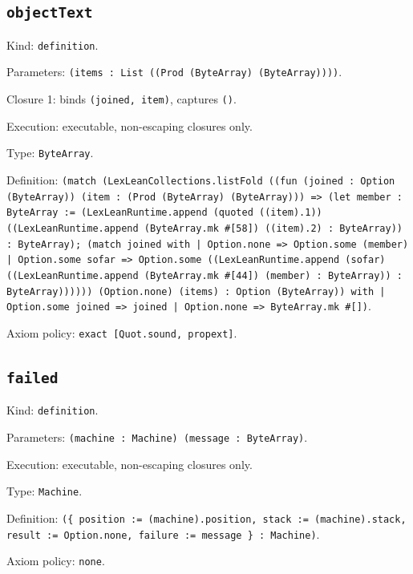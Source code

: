 \documentclass[11pt]{article}
\begin{document}
\subsection*{\texttt{objectText}}
\noindent Kind: \texttt{definition}.\par
\noindent Parameters: \texttt{(items : List ((Prod (ByteArray) (ByteArray))))}.\par
\noindent Closure 1: binds \texttt{(joined, item)}, captures \texttt{()}.\par
\noindent Execution: executable, non-escaping closures only.\par
\noindent Type: \texttt{ByteArray}.\par
\noindent Definition: \texttt{(match (LexLeanCollections.listFold ((fun (joined : Option (ByteArray)) (item : (Prod (ByteArray) (ByteArray))) => (let member : ByteArray := (LexLeanRuntime.append (quoted ((item).1)) ((LexLeanRuntime.append (ByteArray.mk \#[58]) ((item).2) : ByteArray)) : ByteArray); (match joined with | Option.none => Option.some (member) | Option.some sofar => Option.some ((LexLeanRuntime.append (sofar) ((LexLeanRuntime.append (ByteArray.mk \#[44]) (member) : ByteArray)) : ByteArray)))))) (Option.none) (items) : Option (ByteArray)) with | Option.some joined => joined | Option.none => ByteArray.mk \#[])}.\par
\noindent Axiom policy: \texttt{exact [Quot.sound, propext]}.\par
\subsection*{\texttt{failed}}
\noindent Kind: \texttt{definition}.\par
\noindent Parameters: \texttt{(machine : Machine) (message : ByteArray)}.\par
\noindent Execution: executable, non-escaping closures only.\par
\noindent Type: \texttt{Machine}.\par
\noindent Definition: \texttt{(\{ position := (machine).position, stack := (machine).stack, result := Option.none, failure := message \} : Machine)}.\par
\noindent Axiom policy: \texttt{none}.\par
\end{document}
